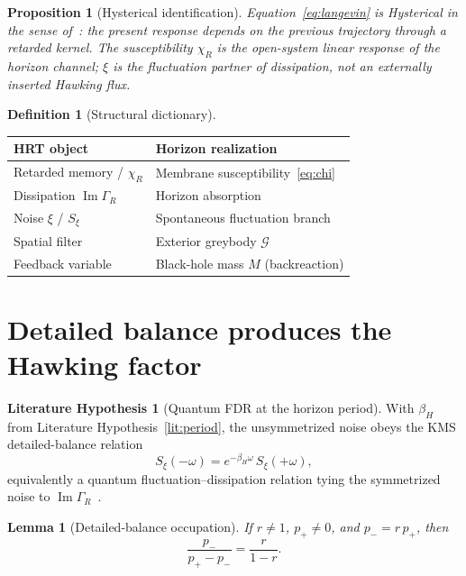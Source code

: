 \documentclass[11pt]{article}
\newtheorem{lemma}[theorem]{Lemma}
\newtheorem{proposition}[theorem]{Proposition}
\theoremstyle{definition}
\newtheorem{definition}[theorem]{Definition}
\newtheorem{literaturehypothesis}[theorem]{Literature Hypothesis}
\theoremstyle{remark}
\newcommand{\Imop}{\operatorname{Im}}
\begin{document}
\begin{proposition}[Hysterical identification]
\label{prop:dict}
Equation~\eqref{eq:langevin} is Hysterical in the sense of~\cite{boyd2026response}:
the present response depends on the previous trajectory through a retarded kernel.
The susceptibility $\chi_R$ is the open-system linear response of the horizon channel;
$\xi$ is the fluctuation partner of dissipation, not an externally inserted Hawking
flux.
\end{proposition}

\begin{definition}[Structural dictionary]
\label{def:dict}
\begin{center}
\small
\begin{tabular}{@{}ll@{}}
\toprule
\textbf{HRT object} & \textbf{Horizon realization}\\
\midrule
Retarded memory / $\chi_R$ & Membrane susceptibility~\eqref{eq:chi}\\
Dissipation $\Imop\Gamma_R$ & Horizon absorption\\
Noise $\xi$ / $S_\xi$ & Spontaneous fluctuation branch\\
Spatial filter & Exterior greybody $\mathcal G$\\
Feedback variable & Black-hole mass $M$ (backreaction)\\
\bottomrule
\end{tabular}
\end{center}
\end{definition}

\section{Detailed balance produces the Hawking factor}
\label{sec:hawking}
\begin{literaturehypothesis}[Quantum FDR at the horizon period]
\label{lit:fdr}
With $\beta_H$ from Literature Hypothesis~\ref{lit:period}, the unsymmetrized noise
obeys the KMS detailed-balance relation
\begin{equation}
\label{eq:kms}
S_\xi(-\omega)=e^{-\beta_H\omega}\,S_\xi(+\omega),
\end{equation}
equivalently a quantum fluctuation--dissipation relation tying the symmetrized noise to
$\Imop\Gamma_R$~\cite{HuRavalSinha2002,Unruh1976}.
\end{literaturehypothesis}

\begin{lemma}[Detailed-balance occupation]
\label{lem:occupation}
If $r\neq1$, $p_+\neq0$, and $p_-=r\,p_+$, then
\[
\frac{p_-}{p_+-p_-}=\frac{r}{1-r}.
\]
\end{lemma}
\end{document}
